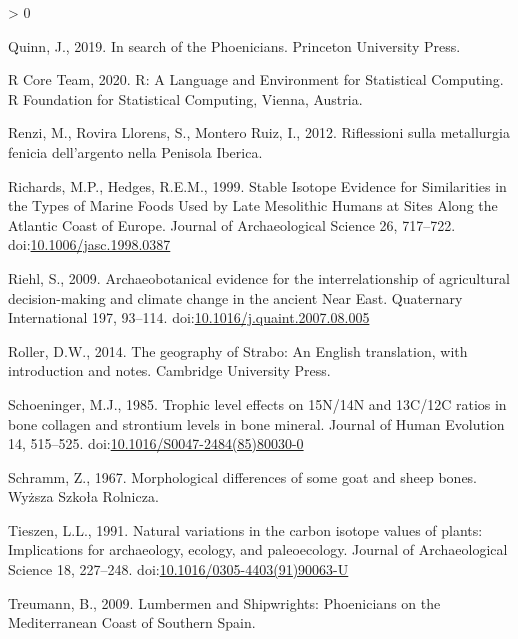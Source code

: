 \documentclass[5p]{elsarticle} %
\newlength{\cslhangindent}
\newenvironment{CSLReferences}[2] %
 {%
  \setlength{\parindent}{0pt}
  \ifodd #1 \everypar{\setlength{\hangindent}{\cslhangindent}}\ignorespaces\fi
  \ifnum #2 > 0
  \setlength{\parskip}{#2\baselineskip}
  \fi
 }%
 {}
\begin{document}
\begin{CSLReferences}{1}{0}
\leavevmode\hypertarget{ref-quinn19}{}%
Quinn, J., 2019. In search of the {Phoenicians}. {Princeton University Press}.

\leavevmode\hypertarget{ref-rcoreteam20}{}%
R Core Team, 2020. R: {A Language} and {Environment} for {Statistical Computing}. {R Foundation for Statistical Computing}, {Vienna, Austria}.

\leavevmode\hypertarget{ref-renzi_etal12}{}%
Renzi, M., Rovira Llorens, S., Montero Ruiz, I., 2012. Riflessioni sulla metallurgia fenicia dell'argento nella {Penisola Iberica}.

\leavevmode\hypertarget{ref-richards_hedges99}{}%
Richards, M.P., Hedges, R.E.M., 1999. Stable {Isotope Evidence} for {Similarities} in the {Types} of {Marine Foods Used} by {Late Mesolithic Humans} at {Sites Along} the {Atlantic Coast} of {Europe}. Journal of Archaeological Science 26, 717--722. doi:\href{https://doi.org/10.1006/jasc.1998.0387}{10.1006/jasc.1998.0387}

\leavevmode\hypertarget{ref-riehl09}{}%
Riehl, S., 2009. Archaeobotanical evidence for the interrelationship of agricultural decision-making and climate change in the ancient {Near East}. Quaternary International 197, 93--114. doi:\href{https://doi.org/10.1016/j.quaint.2007.08.005}{10.1016/j.quaint.2007.08.005}

\leavevmode\hypertarget{ref-roller14}{}%
Roller, D.W., 2014. The geography of {Strabo}: {An English} translation, with introduction and notes. {Cambridge University Press}.

\leavevmode\hypertarget{ref-schoeninger85}{}%
Schoeninger, M.J., 1985. Trophic level effects on {15N}/{14N} and {13C}/{12C} ratios in bone collagen and strontium levels in bone mineral. Journal of Human Evolution 14, 515--525. doi:\href{https://doi.org/10.1016/S0047-2484(85)80030-0}{10.1016/S0047-2484(85)80030-0}

\leavevmode\hypertarget{ref-schramm67}{}%
Schramm, Z., 1967. Morphological differences of some goat and sheep bones. {Wyższa Szkoła Rolnicza}.

\leavevmode\hypertarget{ref-tieszen91}{}%
Tieszen, L.L., 1991. Natural variations in the carbon isotope values of plants: {Implications} for archaeology, ecology, and paleoecology. Journal of Archaeological Science 18, 227--248. doi:\href{https://doi.org/10.1016/0305-4403(91)90063-U}{10.1016/0305-4403(91)90063-U}

\leavevmode\hypertarget{ref-treumann09}{}%
Treumann, B., 2009. Lumbermen and {Shipwrights}: {Phoenicians} on the {Mediterranean Coast} of {Southern Spain}.


\end{CSLReferences}
\end{document}
